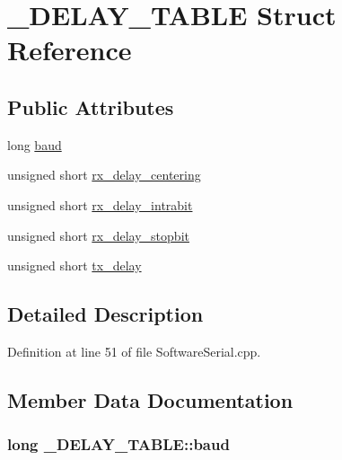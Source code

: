 \hypertarget{struct___d_e_l_a_y___t_a_b_l_e}{\section{\-\_\-\-D\-E\-L\-A\-Y\-\_\-\-T\-A\-B\-L\-E \-Struct \-Reference}
\label{struct___d_e_l_a_y___t_a_b_l_e}
}
\subsection*{\-Public \-Attributes}
\begin{DoxyCompactItemize}
\item 
long \hyperlink{struct___d_e_l_a_y___t_a_b_l_e_a81dc0c3fb2cc8893f4666f23f8db9eca}{baud}
\item 
unsigned short \hyperlink{struct___d_e_l_a_y___t_a_b_l_e_a51aab1d8b68a8ea27646618a30b0e938}{rx\-\_\-delay\-\_\-centering}
\item 
unsigned short \hyperlink{struct___d_e_l_a_y___t_a_b_l_e_a8b81bfff2b179bdc4b6cd2f57df74e8f}{rx\-\_\-delay\-\_\-intrabit}
\item 
unsigned short \hyperlink{struct___d_e_l_a_y___t_a_b_l_e_a459c08839bc23ed1e22b146f7f3ce13d}{rx\-\_\-delay\-\_\-stopbit}
\item 
unsigned short \hyperlink{struct___d_e_l_a_y___t_a_b_l_e_a20098fe273924c2456690a6ea96dc891}{tx\-\_\-delay}
\end{DoxyCompactItemize}


\subsection{\-Detailed \-Description}


\-Definition at line 51 of file \-Software\-Serial.\-cpp.



\subsection{\-Member \-Data \-Documentation}
\hypertarget{struct___d_e_l_a_y___t_a_b_l_e_a81dc0c3fb2cc8893f4666f23f8db9eca}{
\subsubsection[{baud}]{\setlength{\rightskip}{0pt plus 5cm}long {\bf \-\_\-\-D\-E\-L\-A\-Y\-\_\-\-T\-A\-B\-L\-E\-::baud}}}\label{struct___d_e_l_a_y___t_a_b_l_e_a81dc0c3fb2cc8893f4666f23f8db9eca}


